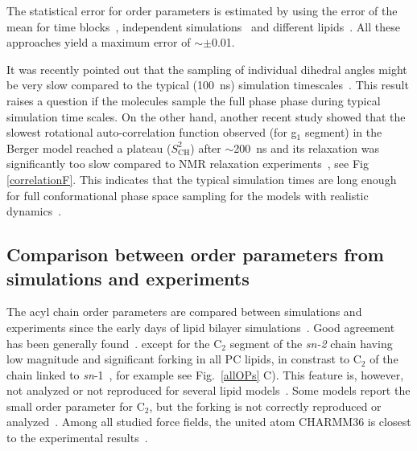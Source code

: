 \documentclass[aps,prl,superscriptaddress,twocolumn]{revtex4}
\begin{document}
The statistical error for order parameters is estimated by using the error of the mean for time blocks~\cite{ollila07a},  
independent simulations~\cite{poger12} and different lipids~\cite{botan15}. All these approaches yield a maximum error of $\sim \pm$0.01.

It was recently pointed out that the sampling of individual dihedral angles might be very
slow compared to the typical (100~ns) simulation timescales~\cite{vogel12}.
This result raises a question if the molecules sample the full phase phase
during typical simulation time scales. On the other hand, another recent study showed
that the slowest rotational auto-correlation function observed (for g$_1$ segment) 
in the Berger model reached a plateau ($S_\mathrm{CH}^2$) after $\sim$200~ns
and its relaxation was significantly too slow compared to NMR relaxation experiments~\cite{ferreira15},
see Fig \ref{correlationF}. 
This indicates that the typical simulation times are long enough for full conformational 
phase space sampling for the models with realistic dynamics~\cite{ferreira15}.



\subsection{Comparison between order parameters from simulations and experiments}\label{OPcompSECTION}

The acyl chain order parameters are compared between simulations and experiments since the early days of lipid bilayer simulations~\cite{ploeg82,egberts88,stouch93,egberts94,essex94,robinson94,hyvonen95,kothekar96,tieleman96,shinoda97,berger97,tieleman97,klauda08b}. 
Good agreement has been generally found~\cite{berger97,hogberg08,poger10,ulmschneider09,kukol09,chiu09,klauda10,dickson12,jambeck12,chowdhary13,maciejewski14,tjornhammar14,dickson14,lee14}.
except for the C$_2$ segment of the {\it sn-2} chain having low magnitude and significant forking in all PC lipids, in constrast to C$_2$ of the chain linked to
{\it sn}-1~\cite{seelig74,seelig75,gross97,dvinskikh05a,ferreira13}, for example see Fig.~\ref{allOPs} C). 
This feature is, however, not analyzed or not reproduced for several lipid models~\cite{hogberg08,siu08,chiu09,kukol09,ulmschneider09,jambeck12,dickson12,chowdhary13,tjornhammar14,maciejewski14}.
Some models report the small order parameter for C$_2$,  but the forking is not correctly reproduced 
or analyzed~\cite{siu08,klauda10,chowdhary13,dickson14}.
Among all studied force fields, the united atom CHARMM36 is closest to the experimental results~\cite{lee14}.
\end{document}
